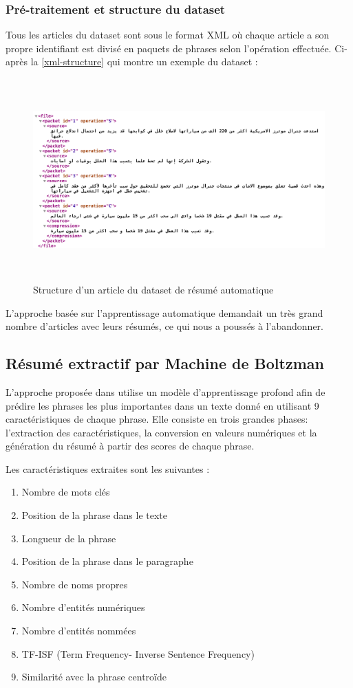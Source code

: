         \subsubsection{Pré-traitement et structure du dataset}
        Tous les articles du dataset sont sous le format XML où chaque article a son propre identifiant est divisé en paquets de phrases selon l'opération effectuée. Ci-après la \autoref{xml-structure} qui montre un exemple du dataset \cite{riad-belkbir}: 
        \begin{figure}[H]
            \centering
            \includegraphics[height=220pt,width=430pt]{img/chapter4/xml.png}
            \caption{Structure d'un article du dataset de résumé automatique}
            \label{xml-structure}
        \end{figure}
        L'approche basée sur l'apprentissage automatique demandait un très grand nombre d'articles avec leurs résumés, ce qui nous a poussés à l'abandonner.

    \subsection{Résumé extractif par Machine de Boltzman}
    L'approche proposée dans \cite{boltzman} utilise un modèle d'apprentissage profond afin de prédire les phrases les plus importantes dans un texte donné en utilisant 9 caractéristiques de chaque phrase. Elle consiste en trois grandes phases: l'extraction des caractéristiques, la conversion en valeurs numériques et la génération du résumé à partir des scores de chaque phrase. 

    Les caractéristiques extraites sont les suivantes :
    \begin{enumerate}
        \item{Nombre de mots clés}
        \item{Position de la phrase dans le texte}
        \item{Longueur de la phrase}
        \item{Position de la phrase dans le paragraphe}
        \item{Nombre de noms propres}
        \item{Nombre d'entités numériques}
        \item{Nombre d'entités nommées}
        \item{TF-ISF (Term Frequency- Inverse Sentence Frequency)}
        \item{Similarité avec la phrase centroïde}
    \end{enumerate} 

